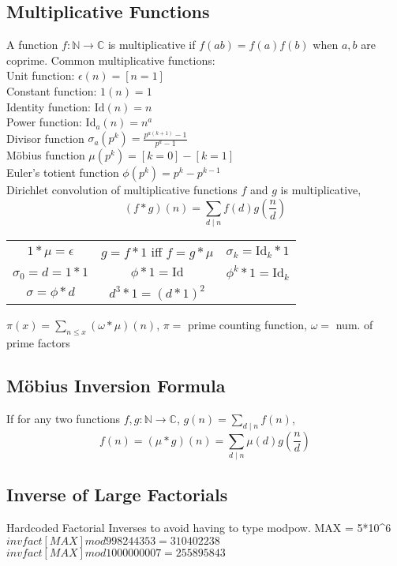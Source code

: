 \subsection{Multiplicative Functions}
A function $f : \mathbb{N} \to \mathbb{C}$ is multiplicative if
$f(ab) = f(a)f(b)$ when $a, b$ are coprime.
Common multiplicative functions: \\
Unit function: $\epsilon(n) = [n = 1]$ \\
Constant function: $1(n) = 1$ \\ 
Identity function: $\mathrm{Id}(n) = n$ \\
Power function: $\mathrm{Id}_a(n) = n^a$ \\
Divisor function $\sigma_a(p^k) = \frac{p^{a(k+1)} - 1}{p^a - 1}$ \\
Möbius function $\mu(p^k) = [k = 0] - [k = 1]$ \\
Euler's totient function $\phi(p^k) = p^k - p^{k-1}$ \\
Dirichlet convolution of multiplicative functions $f$ and $g$ is multiplicative,
\[ (f*g)(n) = \sum_{d \mid n} f(d) g\left(\frac{n}{d}\right) \]
\begin{center}
    \begin{tabular}{ c c c }
        $1 * \mu = \epsilon$ & $g = f * 1$ iff $f = g * \mu$ & $\sigma_k = \mathrm{Id}_k * 1$ \\
        $\sigma_0 = d = 1 * 1$ & $\phi * 1 = \mathrm{Id}$ & $\phi^k * 1 = \mathrm{Id}_k$ \\
        $\sigma = \phi * d$ & $d^3 * 1 = (d * 1)^2$ & 
    \end{tabular}
\end{center}
$\pi(x) = \sum_{n \leq x} (\omega * \mu)(n)$, $\pi = $ prime counting function, $\omega = $ num. of prime factors \\
\subsection{Möbius Inversion Formula}
    If for any two functions $f, g : \mathbb{N} \to \mathbb{C}$, $g(n) = \sum_{d \mid n} f(n)$,
    \[ f(n) = (\mu * g)(n) = \sum_{d \mid n} \mu(d) g \left(\frac{n}{d}\right) \]
\subsection{Inverse of Large Factorials}
    Hardcoded Factorial Inverses to avoid having to type modpow. MAX = 5*10^6
    $ invfact[MAX] mod 998244353 = 310402238 $
    $ invfact[MAX] mod 1000000007 = 255895843 $
